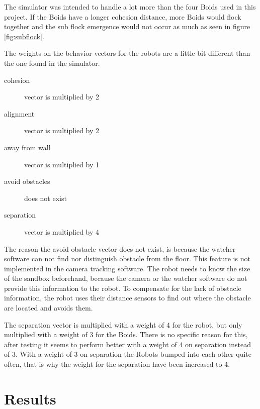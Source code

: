 The simulator was intended to handle a lot more than the four Boids used in this project. If the Boids have a longer cohesion distance, more Boids would flock together and the sub flock emergence would not occur as much as seen in figure \ref{fig:subflock}.

The weights on the behavior vectors for the robots are a little bit different than the one found in the simulator.
\begin{description}
\item[cohesion] vector is multiplied by 2
\item[alignment] vector is multiplied by 2
\item[away from wall] vector is multiplied by 1
\item[avoid obstacles] does not exist
\item[separation] vector is multiplied by 4
\end{description}

The reason the avoid obstacle vector does not exist, is because the watcher software can not find nor distinguish obstacle from the floor. This feature is not implemented in the camera tracking software. The robot needs to know the size of the sandbox beforehand, because the camera or the watcher software do not provide this information to the robot. To compensate for the lack of obstacle information, the robot uses their distance sensors to find out where the obstacle are located and avoids them.

The separation vector is multiplied with a weight of 4 for the robot, but only multiplied with a weight of 3 for the Boids. There is no specific reason for this, after testing it seems to perform better with a weight of 4 on separation instead of 3.
With a weight of 3 on separation the Robots bumped into each other quite often, that is why the weight for the separation have been increased to 4.




\section{Results}
\label{sec:results}

